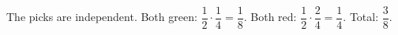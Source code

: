 The picks are independent. Both green: $\dfrac12\cdot\dfrac14=\dfrac18$. Both red: $\dfrac12\cdot\dfrac24=\dfrac14$. Total: $\boxed{\dfrac38}$.

